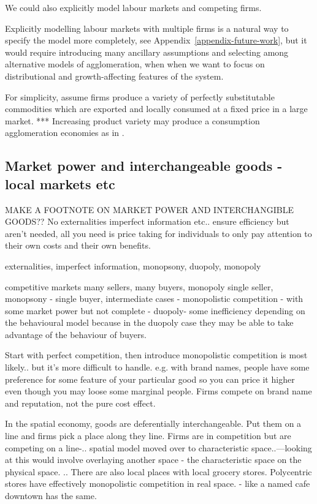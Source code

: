 We could also explicitly model labour markets and competing firms. 

Explicitly modelling labour markets with multiple firms is a natural way to specify the model more completely, see Appendix~\ref{appendix-future-work},  but it would require introducing many ancillary assumptions and selecting among alternative models of agglomeration, when when we want to focus on distributional and growth-affecting features of the system.

For simplicity, assume firms produce a variety of perfectly substitutable commodities which are exported and locally consumed at a fixed price in a large market. 
***  Increasing product variety may produce a consumption agglomeration economies as in \cite{fujitaSpatialEconomyCities1999}.

\subsection{Market power and interchangeable goods - local markets etc}
MAKE A FOOTNOTE ON MARKET POWER AND INTERCHANGIBLE GOODS??
No externalities imperfect information etc.. ensure efficiency but aren't needed, all you need is price taking for individuals to only pay attention to their own costs and their own benefits. 

\gls{externalities}, \gls{imperfect information}, \gls{monopsony}, \gls{duopoly}, \gls{monopoly}

competitive markets many sellers, many buyers, monopoly single seller, monopsony - single buyer, intermediate cases - monopolistic competition - with some market power but not complete - duopoly- some inefficiency depending on the behavioural model because in the duopoly case they may be able to take advantage of the behaviour of buyers.

Start with perfect competition, then introduce monopolistic competition is most likely.. but it's more difficult to handle. e.g. with brand names, people have some preference for some feature of your particular good so you can price it higher even though you may loose some marginal people. Firms compete on brand name and reputation, not the pure cost effect.

In the spatial economy, goods are deferentially interchangeable. Put them on a line and firms pick a place along they line. Firms are in competition but are competing on a line-.. spatial model moved over to characteristic space..---looking at this would involve overlaying another space - the characteristic space on the physical space. .. There are also local places with local grocery stores. Polycentric stores have effectively monopolistic competition in real space. - like a named cafe downtown has the same.

